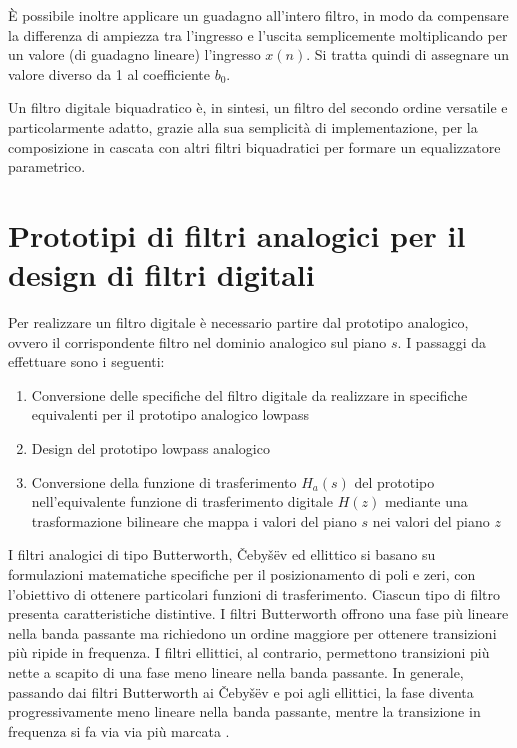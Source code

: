 \documentclass[12pt]{report}
\begin{document}
È possibile inoltre applicare un guadagno all'intero filtro, in modo da compensare la differenza di ampiezza tra l'ingresso e l'uscita semplicemente moltiplicando per un valore (di guadagno lineare) l'ingresso \(x(n)\). Si tratta quindi di assegnare un valore diverso da 1 al coefficiente \(b_0\).

Un filtro digitale biquadratico è, in sintesi, un filtro del secondo ordine versatile e particolarmente adatto, grazie alla sua semplicità di implementazione, per la composizione in cascata con altri filtri biquadratici per formare un equalizzatore parametrico.

\section{Prototipi di filtri analogici per il design di filtri digitali}
Per realizzare un filtro digitale è necessario partire dal prototipo analogico, ovvero il corrispondente filtro nel dominio analogico sul piano \(s\). I passaggi da effettuare sono i seguenti:
\begin{enumerate}
    \item Conversione delle specifiche del filtro digitale da realizzare in specifiche equivalenti per il prototipo analogico lowpass
    \item Design del prototipo lowpass analogico
    \item Conversione della funzione di trasferimento \(H_a(s)\) del prototipo nell'equivalente funzione di trasferimento digitale \(H(z)\) mediante una trasformazione bilineare che mappa i valori del piano \(s\) nei valori del piano \(z\)
\end{enumerate}
\parencite{orfanidis2006lecture}

I filtri analogici di tipo Butterworth, Čebyšëv ed ellittico si basano su formulazioni matematiche specifiche per il posizionamento di poli e zeri, con l’obiettivo di ottenere particolari funzioni di trasferimento. Ciascun tipo di filtro presenta caratteristiche distintive. I filtri Butterworth offrono una fase più lineare nella banda passante ma richiedono un ordine maggiore per ottenere transizioni più ripide in frequenza. I filtri ellittici, al contrario, permettono transizioni più nette a scapito di una fase meno lineare nella banda passante. In generale, passando dai filtri Butterworth ai Čebyšëv e poi agli ellittici, la fase diventa progressivamente meno lineare nella banda passante, mentre la transizione in frequenza si fa via via più marcata \parencite{orfanidis2006lecture}.
\end{document}
